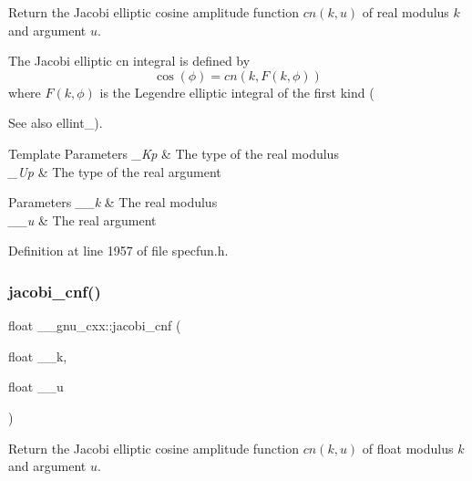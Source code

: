 Return the Jacobi elliptic cosine amplitude function $ cn(k,u) $ of real modulus $ k $ and argument $ u $.

The Jacobi elliptic {\ttfamily cn} integral is defined by \[ \cos(\phi) = cn(k, F(k,\phi)) \] where $ F(k,\phi) $ is the Legendre elliptic integral of the first kind (\begin{DoxySeeAlso}{See also}
ellint\+\_).
\end{DoxySeeAlso}

\begin{DoxyTemplParams}{Template Parameters}
{\em \+\_\+\+Kp} & The type of the real modulus \\
\hline
{\em \+\_\+\+Up} & The type of the real argument \\
\hline
\end{DoxyTemplParams}

\begin{DoxyParams}{Parameters}
{\em \+\_\+\+\_\+k} & The real modulus \\
\hline
{\em \+\_\+\+\_\+u} & The real argument \\
\hline
\end{DoxyParams}


Definition at line 1957 of file specfun.\+h.

\mbox{\label{group__gnu__math__spec__func_gadbd6320123f45ae10d539cf8df0373cd}} 
\subsubsection{\texorpdfstring{jacobi\+\_\+cnf()}{jacobi\_cnf()}}
{\footnotesize\ttfamily float \+\_\+\+\_\+gnu\+\_\+cxx\+::jacobi\+\_\+cnf (\begin{DoxyParamCaption}\item[{float}]{\+\_\+\+\_\+k,  }\item[{float}]{\+\_\+\+\_\+u }\end{DoxyParamCaption})\hspace{0.3cm}{\ttfamily [inline]}}

Return the Jacobi elliptic cosine amplitude function $ cn(k,u) $ of {\ttfamily float} modulus $ k $ and argument $ u $.

